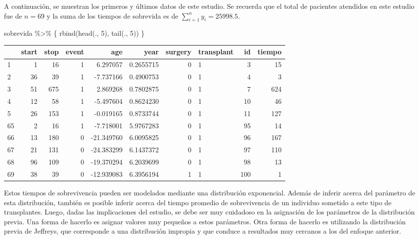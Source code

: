 \documentclass[
  10pt,
  spanish,
]{book}
\newenvironment{Shaded}{\begin{snugshade}}{\end{snugshade}}
\newcommand{\DecValTok}[1]{\textcolor[rgb]{0.00,0.00,0.81}{#1}}
\newcommand{\FunctionTok}[1]{\textcolor[rgb]{0.00,0.00,0.00}{#1}}
\newcommand{\NormalTok}[1]{#1}
\newcommand{\SpecialCharTok}[1]{\textcolor[rgb]{0.00,0.00,0.00}{#1}}
\theoremstyle{definition}
\theoremstyle{definition}
\theoremstyle{definition}
\theoremstyle{definition}
\theoremstyle{remark}
\begin{document}
A continuación, se muestran los primeros y últimos datos de este estudio. Se recuerda que el total de pacientes atendidos en este estudio fue de \(n=69\) y la suma de los tiempos de sobrevida es de \(\sum_{i=1}^ny_i=25998.5\).

\begin{Shaded}
\begin{Highlighting}[]
\NormalTok{sobrevida }\SpecialCharTok{\%\textgreater{}\%}\NormalTok{ \{}
  \FunctionTok{rbind}\NormalTok{(}\FunctionTok{head}\NormalTok{(., }\DecValTok{5}\NormalTok{), }\FunctionTok{tail}\NormalTok{(., }\DecValTok{5}\NormalTok{))}
\NormalTok{\}}
\end{Highlighting}
\end{Shaded}

\begin{tabular}{l|r|r|r|r|r|r|l|r|r}
\hline
  & start & stop & event & age & year & surgery & transplant & id & tiempo\\
\hline
1 & 1 & 16 & 1 & 6.297057 & 0.2655715 & 0 & 1 & 3 & 15\\
\hline
2 & 36 & 39 & 1 & -7.737166 & 0.4900753 & 0 & 1 & 4 & 3\\
\hline
3 & 51 & 675 & 1 & 2.869268 & 0.7802875 & 0 & 1 & 7 & 624\\
\hline
4 & 12 & 58 & 1 & -5.497604 & 0.8624230 & 0 & 1 & 10 & 46\\
\hline
5 & 26 & 153 & 1 & -0.019165 & 0.8733744 & 0 & 1 & 11 & 127\\
\hline
65 & 2 & 16 & 1 & -7.718001 & 5.9767283 & 0 & 1 & 95 & 14\\
\hline
66 & 13 & 180 & 0 & -21.349760 & 6.0095825 & 0 & 1 & 96 & 167\\
\hline
67 & 21 & 131 & 0 & -24.383299 & 6.1437372 & 0 & 1 & 97 & 110\\
\hline
68 & 96 & 109 & 0 & -19.370294 & 6.2039699 & 0 & 1 & 98 & 13\\
\hline
69 & 38 & 39 & 0 & -12.939083 & 6.3956194 & 1 & 1 & 100 & 1\\
\hline
\end{tabular}

Estos tiempos de sobrevivencia pueden ser modelados mediante una distribución exponencial. Además de inferir acerca del parámetro de esta distribución, también es posible inferir acerca del tiempo promedio de sobrevivencia de un individuo sometido a este tipo de transplantes. Luego, dadas las implicaciones del estudio, se debe ser muy cuidadoso en la asignación de los parámetros de la distribución previa. Una forma de hacerlo es asignar valores muy pequeños a estos parámetros. Otra forma de hacerlo es utilizando la distribución previa de Jeffreys, que corresponde a una distribución impropia y que conduce a resultados muy cercanos a los del enfoque anterior.
\end{document}
